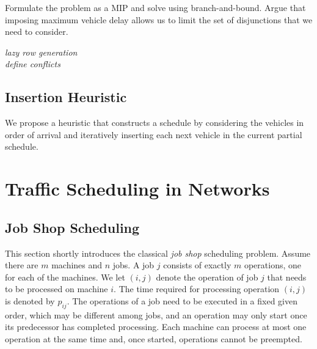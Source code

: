\documentclass{article}
\theoremstyle{definition}
\theoremstyle{plain}
\begin{document}
Formulate the problem as a MIP and solve using branch-and-bound. Argue that
imposing maximum vehicle delay allows us to limit the set of disjunctions that
we need to consider.

\vspace{0.5em}
\noindent
\textit{\color{blue}lazy row generation}\\
\textit{\color{blue}define conflicts}


\subsection{Insertion Heuristic}

We propose a heuristic that constructs a schedule by considering the vehicles in
order of arrival and iteratively inserting each next vehicle in the current
partial schedule.

\newpage

\section{Traffic Scheduling in Networks}

\subsection{Job Shop Scheduling}

This section shortly introduces the classical \textit{job shop} scheduling
problem. Assume there are $m$ machines and $n$ jobs. A job $j$ consists of
exactly $m$ operations, one for each of the machines. We let $(i,j)$ denote the
operation of job $j$ that needs to be processed on machine $i$. The time
required for processing operation $(i,j)$ is denoted by $p_{ij}$. The operations
of a job need to be executed in a fixed given order, which may be different
among jobs, and an operation may only start once its predecessor has completed
processing. Each machine can process at most one operation at the same time and,
once started, operations cannot be preempted.
\end{document}
